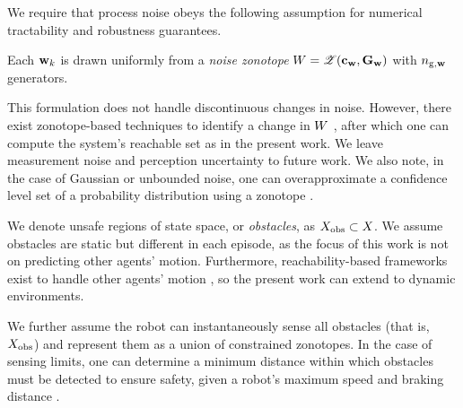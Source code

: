 We require that process noise obeys the following assumption for numerical tractability and robustness guarantees.

\begin{assumption}\label{assumption:noise_zonotope}
Each ${\mathbf{w}}_{k}$ is drawn uniformly from a \emph{noise zonotope} $W = \mathcal{Z}\!\left({\mathbf{c}}_{\mathbf{w}},{\mathbf{G}}_{\mathbf{w}}\right)$ with ${n_{\mathrm{\textnormal{g}},{\mathbf{w}}}}$ generators.%
\end{assumption}
\noindent This formulation does not handle discontinuous changes in noise.
However, there exist zonotope-based techniques to identify a change in $W$ \cite{shetty2020predicting}, after which one can compute the system's reachable set as in the present work.
We leave measurement noise and perception uncertainty to future work.
We also note, in the case of Gaussian or unbounded noise, one can overapproximate a confidence level set of a probability distribution using a zonotope \cite{althoffphdthesis,shetty2020predicting}.

We denote unsafe regions of state space, or \emph{obstacles}, as $X_{\mathrm{\textnormal{obs}}} \subset X$.
We assume obstacles are static but different in each episode, as the focus of this work is not on predicting other agents' motion.
Furthermore, reachability-based frameworks exist to handle other agents' motion \cite{leung2020infusing,vaskov2019not}, so the present work can extend to dynamic environments.

We further assume the robot can instantaneously sense all obstacles (that is, $X_{\mathrm{\textnormal{obs}}}$) and represent them as a union of constrained zonotopes.
In the case of sensing limits, one can determine a minimum distance within which obstacles must be detected to ensure safety, given a robot's maximum speed and braking distance \cite[Section 5]{kousik2020bridging}.





